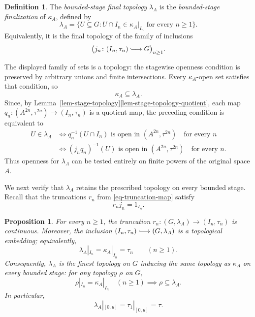 \documentclass[preprint,3p]{elsarticle}
\theoremstyle{plain}
\newtheorem{prop}[thm]{Proposition}
\theoremstyle{definition}
\newtheorem{defn}[thm]{Definition}
\newcommand{\longhookrightarrow}{\lhook\joinrel\longrightarrow}
\numberwithin{equation}{section}
\begin{document}
\begin{defn}
\label{def-Mundici-final-topology}
The \emph{bounded-stage final topology} $\lambda_A$ is the
\emph{bounded-stage finalization} of $\kappa_A$, defined by
\begin{equation}
\label{eq-lambda-stage-test}
 \lambda_A
 =\{U\subseteq G:U\cap I_n\in\kappa_A|_{I_n}
                   \text{ for every }n\geq1\}.
\end{equation}
Equivalently, it is the final topology
of the family of inclusions
\[
 \bigl(j_n\colon(I_n,\tau_n)\longhookrightarrow G\bigr)_{n\geq1}.
\]
\end{defn}

The displayed family of sets is a topology: the stagewise openness
condition is preserved by arbitrary unions and finite intersections.
Every $\kappa_A$-open set satisfies that condition, so
\begin{equation}
\label{eq-kappa-lambda-comparison}
 \kappa_A\subseteq\lambda_A.
\end{equation}
Since, by
Lemma~\ref{lem-stage-topology}\ref{lem-stage-topology-quotient}, each map
$q_n\colon(A^{2n},\tau^{2n})\longrightarrow(I_n,\tau_n)$ is a quotient
map, the preceding
condition is equivalent to
\begin{equation}
\label{eq-lambda-quotient-test}
\begin{aligned}
 U\in\lambda_A
 &\iff
 q_n^{-1}(U\cap I_n)\text{ is open in }(A^{2n},\tau^{2n})
 \quad\text{for every }n \\
 &\iff
 (j_nq_n)^{-1}(U)\text{ is open in }(A^{2n},\tau^{2n})
 \quad\text{for every }n.
\end{aligned}
\end{equation}
Thus openness for $\lambda_A$ can be tested entirely on finite powers of
the original space $A$.

We next verify that $\lambda_A$ retains the prescribed topology on
every bounded stage.  Recall that the truncations $r_n$ from
\eqref{eq-truncation-map} satisfy
\begin{equation}
\label{eq-truncation-retraction}
 r_nj_n=1_{I_n}.
\end{equation}

\begin{prop}
\label{prop-lambda-exact-space}
For every $n\geq1$, the truncation
$r_n\colon(G,\lambda_A)\longrightarrow(I_n,\tau_n)$
is continuous.  Moreover, the inclusion
$(I_n,\tau_n)\longhookrightarrow(G,\lambda_A)$
is a topological embedding; equivalently,
\begin{equation}
\label{eq-lambda-stage-restriction}
 \lambda_A|_{I_n}=\kappa_A|_{I_n}=\tau_n
 \qquad(n\geq1).
\end{equation}
Consequently, $\lambda_A$ is the finest topology on $G$ inducing
the same topology as $\kappa_A$ on every bounded stage: for any topology
$\rho$ on $G$,
\[
 \rho|_{I_n}=\kappa_A|_{I_n}\quad(n\geq1)
 \implies \rho\subseteq\lambda_A.
\]
In particular,
\begin{equation}
\label{eq-stage-one-exactness}
 \lambda_A|_{[0,u]}
 =
 \tau_1|_{[0,u]}
 =
 \tau.
\end{equation}
\end{prop}
\end{document}
